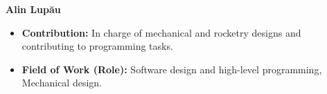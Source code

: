\item[] \textbf{Alin Lup\u{a}u}
    \begin{itemize}[label=]
        \item[\faEdit] \textbf{Contribution:} In charge of mechanical and rocketry designs and contributing to programming tasks. 
        \item[\faMicroscope] \textbf{Field of Work (Role):} Software design and high-level programming, Mechanical design.
    \end{itemize}
    \vspace{0.2 cm}
    